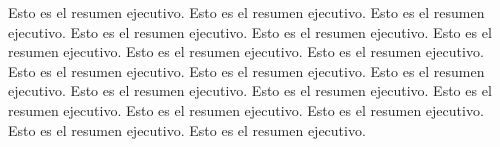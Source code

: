 Esto es el resumen ejecutivo. Esto es el resumen ejecutivo.
Esto es el resumen ejecutivo. Esto es el resumen ejecutivo.
Esto es el resumen ejecutivo. Esto es el resumen ejecutivo.
Esto es el resumen ejecutivo. Esto es el resumen ejecutivo.
Esto es el resumen ejecutivo. Esto es el resumen ejecutivo.
Esto es el resumen ejecutivo. Esto es el resumen ejecutivo.
Esto es el resumen ejecutivo. Esto es el resumen ejecutivo.
Esto es el resumen ejecutivo. Esto es el resumen ejecutivo.
Esto es el resumen ejecutivo. Esto es el resumen ejecutivo.